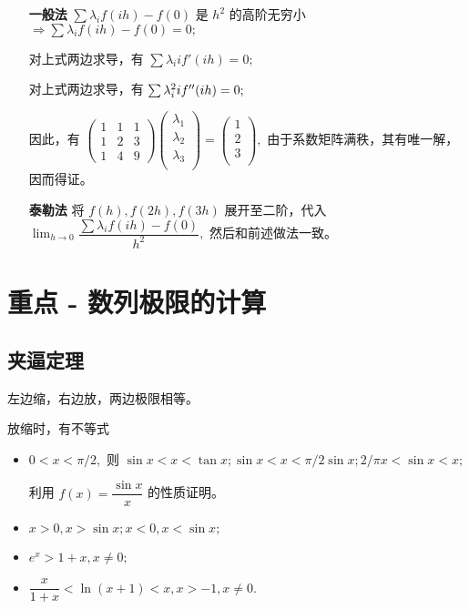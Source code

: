 \begin{itemize}
    \item[\textbf{一般法}]
    $ \sum \lambda_if(ih) - f(0) $ 是 $ h^2 $ 的高阶无穷小 $ \Rightarrow \sum \lambda_if(ih) - f(0) = 0; $ 

    对上式两边求导，有 $ \sum \lambda_i if'(ih) = 0; $ 

    对上式两边求导，有 $ \sum \lambda_i^2 if^{\prime\prime}(ih) = 0; $ 

    因此，有 $ \begin{pmatrix}
        1&1&1\\ 1&2&3\\ 1&4&9
    \end{pmatrix}\begin{pmatrix}
        \lambda_1 \\
        \lambda_2 \\
        \lambda_3 \\
    \end{pmatrix} = 
    \begin{pmatrix}
        1 \\
        2 \\
        3 \\
    \end{pmatrix}, $ 由于系数矩阵满秩，其有唯一解，因而得证。
    \item[\textbf{泰勒法}]
    将 $ f(h),f(2h),f(3h) $ 展开至二阶，代入
    $ {\displaystyle\lim_{h\rightarrow 0}}\dfrac{\sum \lambda_i f(ih) - f(0)}{h^2}, $ 
    然后和前述做法一致。
\end{itemize}

\section{重点 - 数列极限的计算}

\subsection{夹逼定理}

左边缩，右边放，两边极限相等。

放缩时，有不等式

\begin{itemize}
    \item $ 0<x<\pi/2, $ 则 $ \sin x<x<\tan x;
    \sin x < x < \pi/2 \sin x; 2/\pi x < \sin x < x; $ 
    
    利用 $ f(x) = \dfrac{\sin x}{x} $ 的性质证明。
    \item $ x > 0, x > \sin x; x < 0, x < \sin x; $ 
    \item $ e^x > 1 + x, x\neq 0; $ 
    \item $ \dfrac{x}{1+x}< \ln (x+1)< x, x > -1, x \neq 0. $ 
\end{itemize}


